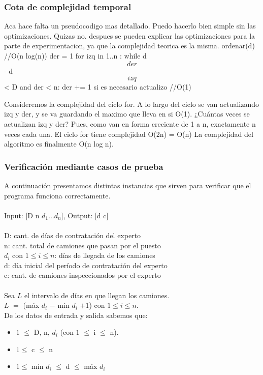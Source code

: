 \documentclass[11pt, a4paper, twoside]{article}
\begin{document}
\subsubsection{Cota de complejidad temporal}
Aca hace falta un pseudocodigo mas detallado. Puedo hacerlo bien simple sin las optimizaciones. Quizas no. despues se pueden explicar las optimizaciones para la parte de experimentacion, ya que la complejidad teorica es la misma.
ordenar(d) //O(n log(n))
der = 1
for izq in 1..n :
    while d\[der\] - d\[izq\] < D and der < n:
        der += 1
    si es necesario actualizo //O(1)

Consideremos la complejidad del ciclo for. A lo largo del ciclo se van actualizando izq y der, y se va guardando el maximo que lleva  en si O(1).
¿Cuántas veces se actualizan izq y der? Pues, como van en forma creciente de 1 a n, exactamente n veces cada una. El ciclo for tiene complejidad O(2n) = O(n)
La complejidad del algoritmo es finalmente O(n log n).

\subsubsection{Verificación mediante casos de prueba}

A continuación presentamos distintas instancias que sirven para verificar que el programa funciona correctamente. \\ 
\\
Input: [D n $d_1$...$d_n$], Output: [d c] \\
\\
D: cant. de días de contratación del experto \\
n: cant.  total de camiones que pasan por el puesto \\
$d_i$ con $1 \le i \le n$: días de llegada de los camiones \\
d: día inicial del período de contratación del experto \\
c: cant. de camiones inspeccionados por el experto \\  
\\
Sea $L$ el intervalo de días en que llegan los camiones. \\
$L$ $=$ (máx $d_i$ $-$ mín $d_i$ $+ 1$) con $1 \le i \le n$. \\

De los datos de entrada y salida sabemos que: 

\begin{itemize}
    \item $1$ $\le$ D, n, $d_i$ (con $1$ $\le$ i $\le$ n).
	\item $1 \le $ c $\le$ n 
	\item $1 \le $ mín $d_i$ $\le$ d $\le$ máx $d_i$ 
\end{itemize}
\end{document}
